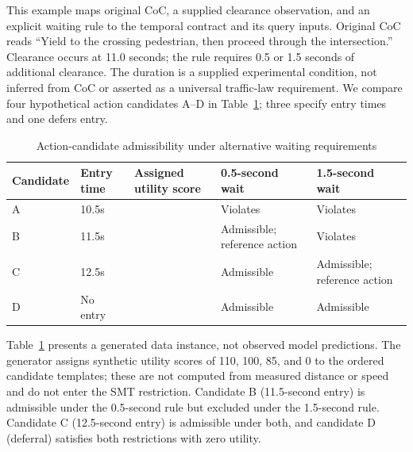 \documentclass[nolineno]{ieeeaccess}
\begin{document}
This example maps original CoC, a supplied clearance observation, and an explicit waiting rule to the temporal contract and its query inputs. Original CoC reads “Yield to the crossing pedestrian, then proceed through the intersection.” Clearance occurs at 11.0 seconds; the rule requires 0.5 or 1.5 seconds of additional clearance. The duration is a supplied experimental condition, not inferred from CoC or asserted as a universal traffic-law requirement. We compare four hypothetical action candidates A--D in Table~\ref{tab:temporal-candidates}; three specify entry times and one defers entry.\par


\begin{table}[tp]\caption{Action-candidate admissibility under alternative waiting requirements}\label{tab:temporal-candidates}
\centering\fontsize{8}{10}\selectfont\setlength{\tabcolsep}{3pt}
\begin{tabular}{@{}>{\raggedright\arraybackslash}p{}>{\raggedright\arraybackslash}p{}>{\raggedright\arraybackslash}p{}>{\raggedright\arraybackslash}p{}>{\raggedright\arraybackslash}p{}@{}}
\toprule
\textbf{Candidate} & \textbf{Entry time} & \textbf{Assigned utility score} & \textbf{0.5-second wait} & \textbf{1.5-second wait}\\
\midrule
A & 10.5s & 110 & Violates & Violates\\[3pt]
B & 11.5s & 100 & Admissible; reference action & Violates\\[3pt]
C & 12.5s & 85 & Admissible & Admissible; reference action\\[3pt]
D & No entry & 0 & Admissible & Admissible\\[3pt]
\bottomrule\end{tabular}
\end{table}

Table~\ref{tab:temporal-candidates} presents a generated data instance, not observed model predictions. The generator assigns synthetic utility scores of 110, 100, 85, and 0 to the ordered candidate templates; these are not computed from measured distance or speed and do not enter the SMT restriction. Candidate B (11.5-second entry) is admissible under the 0.5-second rule but excluded under the 1.5-second rule. Candidate C (12.5-second entry) is admissible under both, and candidate D (deferral) satisfies both restrictions with zero utility.\par
\end{document}
